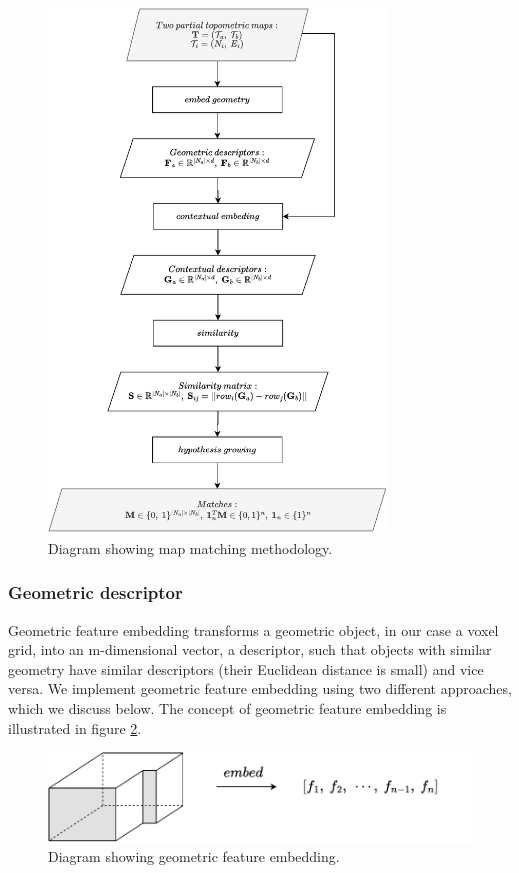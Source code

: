 \begin{figure}[p]
    \centering
    \includegraphics*[width=0.8\textwidth]{./fig/flowchart_complete-Map match.drawio.pdf}
    \caption{Diagram showing map matching methodology.}
    \label{fig:flowchart_match}
\end{figure}

\pagebreak

\subsubsection{Geometric descriptor}
Geometric feature embedding transforms a geometric object, in our case a voxel grid, into an m-dimensional vector, a descriptor, such that objects with similar geometry have similar descriptors (their Euclidean distance is small) and vice versa. We implement geometric feature embedding using two different approaches, which we discuss below. The concept of geometric feature embedding is illustrated in figure \ref{fig:geometric_embedding}.

\begin{figure}[h]
    \centering
    \includegraphics*[width=.8\textwidth]{./fig/embed_geometry.pdf}
    \caption{Diagram showing geometric feature embedding.}
    \label{fig:geometric_embedding}
\end{figure}

